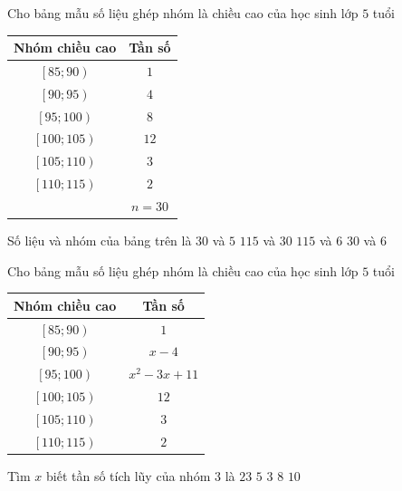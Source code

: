 \begin{ex}%
	Cho bảng mẫu số liệu ghép nhóm là chiều cao của học sinh lớp $5$ tuổi
	\begin{center}
		\begin{tabular}{|c|c|}
			\hline
			Nhóm chiều cao & Tần số \\
			\hline
			$\left[85;90\right)$ & $1$ \\
			\hline
			$\left[90;95\right)$ & $4$ \\
			\hline
			$\left[95;100\right)$ & $8$ \\
			\hline
			$\left[100;105\right)$ & $12$ \\
			\hline
			$\left[105;110\right)$ & $3$ \\
			\hline
			$\left[110;115\right)$ & $2$ \\
			\hline
			& $n=30$ \\
			\hline
		\end{tabular}
	\end{center}
	Số liệu và nhóm của bảng trên là
	\choice
	{$30$ và $5$}
	{$115$ và $30$}
	{$115$ và $6$}
	{\True $30$ và $6$}
\end{ex}

\begin{ex}%
	Cho bảng mẫu số liệu ghép nhóm là chiều cao của học sinh lớp $5$ tuổi
	\begin{center}
		\begin{tabular}{|c|c|}
			\hline
			Nhóm chiều cao & Tần số \\
			\hline
			$\left[85;90\right)$ & $1$ \\
			\hline
			$\left[90;95\right)$ & $x-4$ \\
			\hline
			$\left[95;100\right)$ & $x^2-3x+11$ \\
			\hline
			$\left[100;105\right)$ & $12$ \\
			\hline
			$\left[105;110\right)$ & $3$ \\
			\hline
			$\left[110;115\right)$ & $2$ \\
			\hline
		\end{tabular}
	\end{center}
	Tìm $x$ biết tần số tích lũy của nhóm $3$ là $23$
	\choice
	{\True $5$}
	{$3$}
	{$8$}
	{$10$}
\end{ex}

